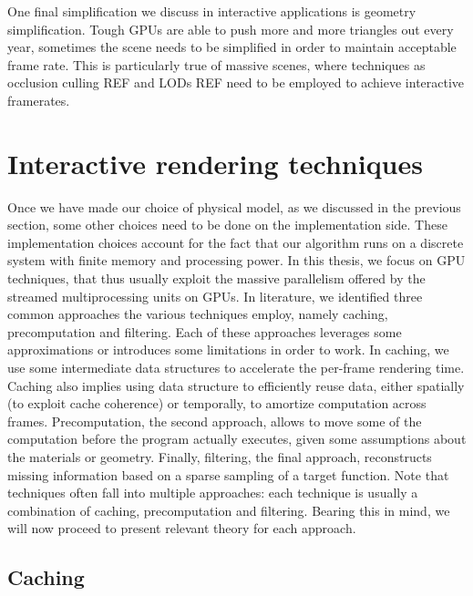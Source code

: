 One final simplification we discuss in interactive applications is geometry simplification. Tough GPUs are able to push more and more triangles out every year, sometimes the scene needs to be simplified in order to maintain acceptable frame rate. This is particularly true of massive scenes, where techniques as occlusion culling REF and LODs REF need to be employed to achieve interactive framerates. 

\section{Interactive rendering techniques}
%
Once we have made our choice of physical model, as we discussed in the previous section,  some other choices need to be done on the implementation side. These implementation choices account for the fact that our algorithm runs on a discrete system with finite memory and processing power. In this thesis, we focus on GPU techniques, that thus usually exploit the massive parallelism offered by the streamed multiprocessing units on GPUs. In literature, we identified three common approaches the various techniques employ, namely caching, precomputation and filtering. Each of these approaches leverages some approximations or introduces some limitations in order to work. In caching, we use some intermediate data structures to accelerate the per-frame rendering time. Caching also implies using data structure to efficiently reuse data, either spatially (to exploit cache coherence) or temporally, to amortize computation across frames. Precomputation, the second approach, allows to move some of the computation before the program actually executes, given some assumptions about the materials or geometry. Finally, filtering, the final approach, reconstructs missing information based on a sparse sampling of a target function. Note that techniques often fall into multiple approaches: each technique is usually a combination of caching, precomputation and filtering. Bearing this in mind, we will now proceed to present relevant theory for each approach.
%
\subsection{Caching}

